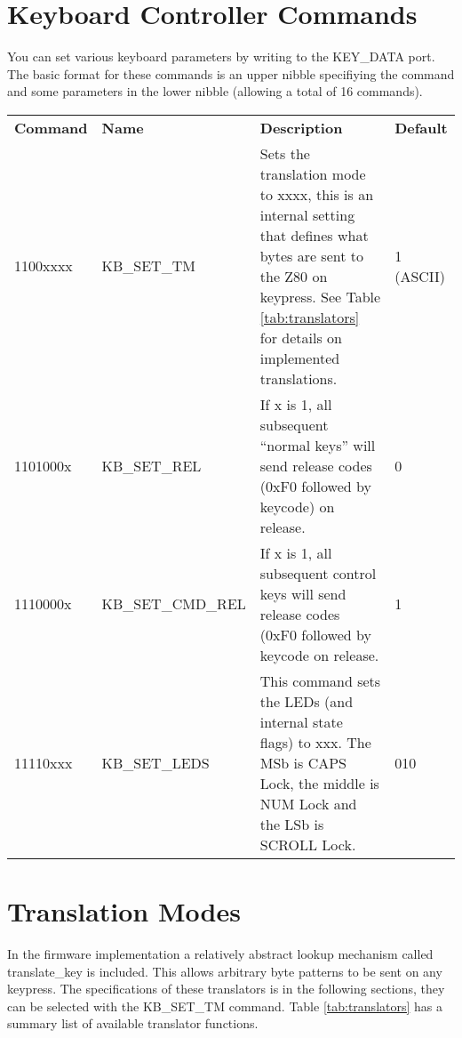 
\section{Keyboard Controller Commands}
You can set various keyboard parameters by writing to the KEY\_DATA port.  The
basic format for these commands is an upper nibble specifiying the command and
some parameters in the lower nibble (allowing a total of 16 commands).

\begin{tabular}{llp{6cm}l}
 \textbf{Command}&\textbf{Name}&\textbf{Description}&\textbf{Default}\\
 1100xxxx&KB\_SET\_TM&Sets the translation mode to xxxx, this is an internal 
                      setting that defines what bytes are sent to the Z80 on
                      keypress. See Table \ref{tab:translators} for details on 
                      implemented translations.& 1 (ASCII)\\
 1101000x&KB\_SET\_REL&If x is 1, all subsequent ``normal keys'' will send
                       release codes (0xF0 followed by keycode) on release.&0\\
 1110000x&KB\_SET\_CMD\_REL&If x is 1, all subsequent control keys will send
                            release codes (0xF0 followed by keycode on release.
 &1\\
 11110xxx&KB\_SET\_LEDS&This command sets the LEDs (and internal state flags)
                        to xxx.  The MSb is CAPS Lock, the middle is NUM Lock
                        and the LSb is SCROLL Lock.&010\\
\end{tabular}

\section{Translation Modes}
In the firmware implementation a relatively abstract lookup mechanism called
translate\_key is included.  This allows arbitrary byte patterns to be sent on
any keypress.  The specifications of these translators is in the following
sections, they can be selected with the KB\_SET\_TM command.  Table
\ref{tab:translators} has a summary list of available translator functions.

